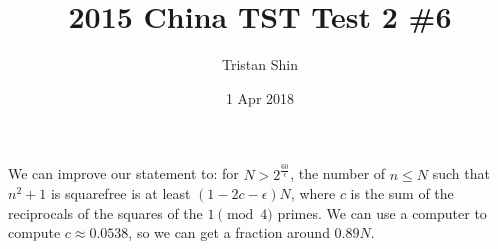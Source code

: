 \documentclass[a4paper, 12pt]{article}
\title{2015 China TST Test 2 \#6}
\author{Tristan Shin}
\date{1 Apr 2018}
\begin{document}
\maketitle


\hrulefill

\begin{solution}
\end{solution}

\begin{remark}
We can improve our statement to: for $N>2^{\frac{60}{\epsilon}}$, the number of $n\leq N$ such that $n^2+1$ is squarefree is at least $\left(1-2c-\epsilon\right)N$, where $c$ is the sum of the reciprocals of the squares of the $1\pmod4$ primes. We can use a computer to compute $c\approx0.0538$, so we can get a fraction around $0.89N$.
\end{remark}
\end{document}
